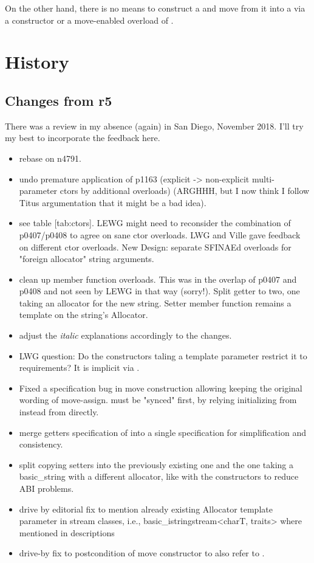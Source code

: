 \documentclass[ebook,11pt,article]{memoir}
\renewcommand{\ref}[1]{[#1]}
\begin{document}
On the other hand, there is no means to construct a  and move from it into a  via a constructor or a move-enabled overload of .

\section{History}

\subsection{Changes from r5}
There was a review in my absence (again) in San Diego, November 2018. I'll try my best to incorporate the feedback here.
\begin{itemize}
\item rebase on n4791.
\item undo premature application of p1163 (explicit -> non-explicit multi-parameter ctors by additional overloads) (ARGHHH, but I now think I follow Titus argumentation that it might be a bad idea).
\item see table \ref{tab:ctors}. LEWG might need to reconsider the combination of p0407/p0408 to agree on sane ctor overloads. LWG and Ville gave feedback on different ctor overloads. New Design: separate SFINAEd overloads for "foreign allocator" string arguments.
\item clean up  member function overloads. This was in the overlap of p0407 and p0408 and not seen by LEWG in that way (sorry!). Split getter to two, one taking an allocator for the new string. Setter  member function remains a template on the string's Allocator. 
\item adjust the \emph{italic} explanations accordingly to the changes.
\item LWG question: Do the constructors taling a  template parameter restrict it  to  requirements? It is implicit via .
\item Fixed a specification bug in move construction allowing keeping the original wording of move-assign.  must be "synced" first, by relying initializing  from   instead from  directly.
\item merge getters  specification of  into a single specification for simplification and consistency.
\item split copying setters  into the previously existing one and the one taking a basic_string with a different allocator, like with the constructors to reduce ABI problems.
\item drive by editorial fix to mention already existing Allocator template parameter in stream classes, i.e., basic_istringstream<charT, traits> where mentioned in descriptions
\item drive-by fix to postcondition of  move constructor to also refer to .
\end{itemize}
\end{document}
